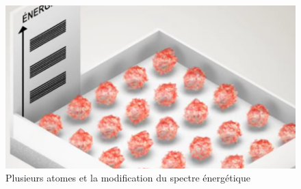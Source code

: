 \begin{figure}[H]
	\begin{center}
		\includegraphics[scale=0.2]{./img/IM6}
		\caption{Plusieurs atomes et la modification du spectre énergétique}
	\end{center}
\end{figure}